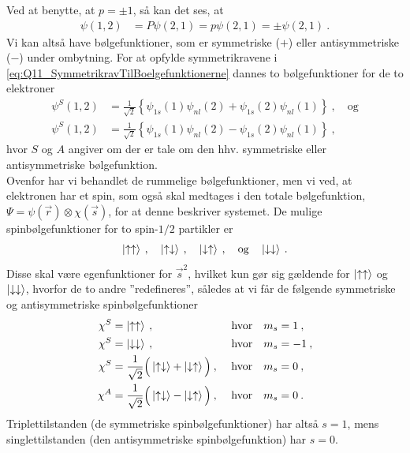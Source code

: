 Ved at benytte, at $p = \pm 1$, så kan det ses, at
\begin{align} \label{eq:Q11_SymmetrikravTilBoelgefunktionerne}
    \psi(1,2) &= P\psi(2,1) = p\psi(2,1) = \pm \psi(2,1) \: .
\end{align}
Vi kan altså have bølgefunktioner, som er symmetriske ($+$) eller antisymmetriske ($-$) under ombytning. For at opfylde symmetrikravene i \cref{eq:Q11_SymmetrikravTilBoelgefunktionerne} dannes to bølgefunktioner for de to elektroner
\begin{align}
    \psi^S(1,2) &= \frac{1}{\sqrt{2}} \left\{\psi_{1s}(1)\psi_{nl}(2) + \psi_{1s}(2)\psi_{nl}(1)\right\} \: , \quad \text{og} \\
    \psi^S(1,2) &= \frac{1}{\sqrt{2}} \left\{\psi_{1s}(1)\psi_{nl}(2) - \psi_{1s}(2)\psi_{nl}(1)\right\} \: ,
\end{align}
hvor $S$ og $A$ angiver om der er tale om den hhv. symmetriske eller antisymmetriske bølgefunktion.\\

Ovenfor har vi behandlet de rummelige bølgefunktioner, men vi ved, at elektronen har et spin, som også skal medtages i den totale bølgefunktion, $\Psi = \psi(\Vec{r}) \otimes \chi(\Vec{s})$, for at denne beskriver systemet. De mulige spinbølgefunktioner for to spin-$1/2$ partikler er
\begin{align}
    \ket{\uparrow\uparrow} \: , \quad \ket{\uparrow\downarrow} \: , \quad \ket{\downarrow\uparrow} \: , \quad \text{og} \quad \ket{\downarrow\downarrow} \: .
\end{align}
Disse skal være egenfunktioner for $\Vec{s}^2$, hvilket kun gør sig gældende for $\ket{\uparrow\uparrow}$ og $\ket{\downarrow\downarrow}$, hvorfor de to andre ''redefineres'', således at vi får de følgende symmetriske og antisymmetriske spinbølgefunktioner
\begin{align}
    \chi^S &= \ket{\uparrow\uparrow} \: , \qquad \qquad \qquad \quad \text{hvor} \quad m_s = 1 \: , \\
    \chi^S &= \ket{\downarrow\downarrow} \: , \qquad \qquad \qquad \quad \text{hvor} \quad m_s = -1 \: , \\
    \chi^S &= \frac{1}{\sqrt{2}} \Big(\ket{\uparrow\downarrow} + \ket{\downarrow\uparrow}\Big) \: , \,\quad \text{hvor} \quad m_s = 0 \: , \\
    \chi^A &= \frac{1}{\sqrt{2}} \Big(\ket{\uparrow\downarrow} - \ket{\downarrow\uparrow}\Big) \: , \,\quad \text{hvor} \quad m_s = 0 \: .
\end{align}
Triplettilstanden (de symmetriske spinbølgefunktioner) har altså $s = 1$, mens singlettilstanden (den antisymmetriske spinbølgefunktion) har $s = 0$.


